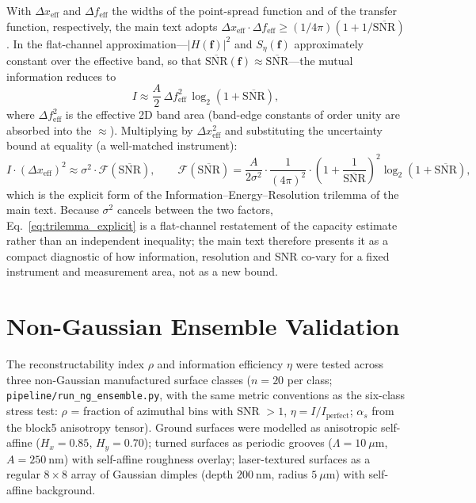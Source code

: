 \documentclass[review,12pt]{elsarticle}
\begin{document}
With $\Delta x_\mathrm{eff}$ and $\Delta f_\mathrm{eff}$ the widths of the point-spread function and of the transfer function, respectively, the main text adopts $\Delta x_\mathrm{eff}\cdot\Delta f_\mathrm{eff} \geq (1/4\pi)(1+1/\overline{\mathrm{SNR}})$. In the flat-channel approximation---$|H(\mathbf{f})|^2$ and $S_\eta(\mathbf{f})$ approximately constant over the effective band, so that $\overline{\mathrm{SNR}}(\mathbf{f}) \approx \overline{\mathrm{SNR}}$---the mutual information reduces to
\begin{equation}
    I \approx \frac{A}{2}\,\Delta f_\mathrm{eff}^2\,\log_2\!\left(1 + \overline{\mathrm{SNR}}\right),
    \label{eq:flat_capacity}
\end{equation}
where $\Delta f_\mathrm{eff}^2$ is the effective 2D band area (band-edge constants of order unity are absorbed into the $\approx$). Multiplying by $\Delta x_\mathrm{eff}^2$ and substituting the uncertainty bound at equality (a well-matched instrument):
\begin{equation}
    I \cdot (\Delta x_\mathrm{eff})^2 \approx \sigma^2 \cdot \mathcal{F}(\overline{\mathrm{SNR}}),
    \qquad
    \mathcal{F}(\overline{\mathrm{SNR}}) = \frac{A}{2\sigma^2}\cdot\frac{1}{(4\pi)^2}\cdot\left(1 + \frac{1}{\overline{\mathrm{SNR}}}\right)^{\!2}
    \log_2\!\left(1 + \overline{\mathrm{SNR}}\right),
    \label{eq:trilemma_explicit}
\end{equation}
which is the explicit form of the Information--Energy--Resolution trilemma of the main text. Because $\sigma^2$ cancels between the two factors, Eq.~\ref{eq:trilemma_explicit} is a flat-channel restatement of the capacity estimate rather than an independent inequality; the main text therefore presents it as a compact diagnostic of how information, resolution and SNR co-vary for a fixed instrument and measurement area, not as a new bound.


\section{Non-Gaussian Ensemble Validation}
\label{S5}

The reconstructability index $\rho$ and information efficiency $\eta$ were tested across three non-Gaussian manufactured surface classes ($n=20$ per class; \texttt{pipeline/run\_ng\_ensemble.py}, with the same metric conventions as the six-class stress test: $\rho$ = fraction of azimuthal bins with SNR $> 1$, $\eta = I/I_\mathrm{perfect}$; $\alpha_s$ from the block5 anisotropy tensor). Ground surfaces were modelled as anisotropic self-affine ($H_x=0.85$, $H_y=0.70$); turned surfaces as periodic grooves ($\Lambda=10\ \mu\text{m}$, $A=250\ \text{nm}$) with self-affine roughness overlay; laser-textured surfaces as a regular $8\times8$ array of Gaussian dimples (depth $200\ \text{nm}$, radius $5\ \mu\text{m}$) with self-affine background.
\end{document}
